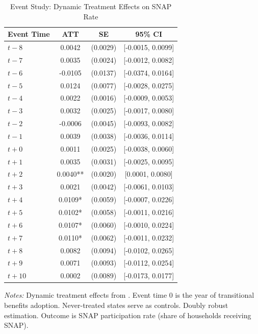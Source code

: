 
\begin{table}[H]
\centering
\caption{Event Study: Dynamic Treatment Effects on SNAP Rate}
\label{tab:event_study}
\begin{threeparttable}
\begin{tabular}{lccc}
\toprule
Event Time & ATT & SE & 95\% CI \\
\midrule
  $t-8$ & 0.0042 & (0.0029) & [-0.0015, 0.0099] \\
  $t-7$ & 0.0035 & (0.0024) & [-0.0012, 0.0082] \\
  $t-6$ & -0.0105 & (0.0137) & [-0.0374, 0.0164] \\
  $t-5$ & 0.0124 & (0.0077) & [-0.0028, 0.0275] \\
  $t-4$ & 0.0022 & (0.0016) & [-0.0009, 0.0053] \\
  $t-3$ & 0.0032 & (0.0025) & [-0.0017, 0.0080] \\
  $t-2$ & -0.0006 & (0.0045) & [-0.0093, 0.0082] \\
  $t-1$ & 0.0039 & (0.0038) & [-0.0036, 0.0114] \\
  $t+0$ & 0.0011 & (0.0025) & [-0.0038, 0.0060] \\
  $t+1$ & 0.0035 & (0.0031) & [-0.0025, 0.0095] \\
  $t+2$ & 0.0040** & (0.0020) & [0.0001, 0.0080] \\
  $t+3$ & 0.0021 & (0.0042) & [-0.0061, 0.0103] \\
  $t+4$ & 0.0109* & (0.0059) & [-0.0007, 0.0226] \\
  $t+5$ & 0.0102* & (0.0058) & [-0.0011, 0.0216] \\
  $t+6$ & 0.0107* & (0.0060) & [-0.0010, 0.0224] \\
  $t+7$ & 0.0110* & (0.0062) & [-0.0011, 0.0232] \\
  $t+8$ & 0.0082 & (0.0094) & [-0.0102, 0.0265] \\
  $t+9$ & 0.0071 & (0.0093) & [-0.0112, 0.0254] \\
  $t+10$ & 0.0002 & (0.0089) & [-0.0173, 0.0177] \\
\bottomrule
\end{tabular}
\begin{tablenotes}[flushleft]
\small
\item \textit{Notes:} Dynamic treatment effects from \citet{callaway2021difference}. Event time 0 is the year of transitional benefits adoption. Never-treated states serve as controls. Doubly robust estimation. Outcome is SNAP participation rate (share of households receiving SNAP).
\end{tablenotes}
\end{threeparttable}
\end{table}
